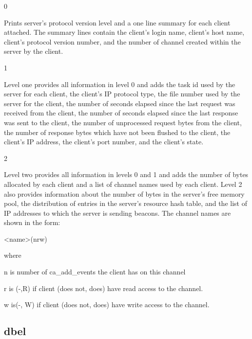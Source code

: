 \begin{description}\item 0 

\end{description}Prints server's protocol version level and a one line summary for each client attached. The summary lines 
contain the client's login name, client's host name, client's protocol version number, and the number of 
channel created within the server by the client.

\begin{description}\item 1

\end{description}Level one provides all information in level 0 and adds the task id used by the server for each client, the 
client's IP protocol type, the file number used by the server for the client, the number of seconds elapsed 
since the last request was received from the client, the number of seconds elapsed since the last response 
was sent to the client, the number of unprocessed request bytes from the client, the number of response bytes 
which have not been flushed to the client, the client's IP address, the client's port number, and the client's 
state.

\begin{description}\item 2

\end{description}Level two provides all information in levels 0 and 1 and adds the number of bytes allocated by each client 
and a list of channel names used by each client. Level 2 also provides information about the number of bytes 
in the server's free memory pool, the distribution of entries in the server's resource hash table, and the list of 
IP addresses to which the server is sending beacons. The channel names are shown in the form:

\textless{}name\textgreater{}(nrw)



where

n is number of ca\_add\_events the client has on this channel

r is (-,R) if client (does not, does) have read access to the channel.

w is(-, W) if client (does not, does) have write access to the channel.

\subsection{dbel}

